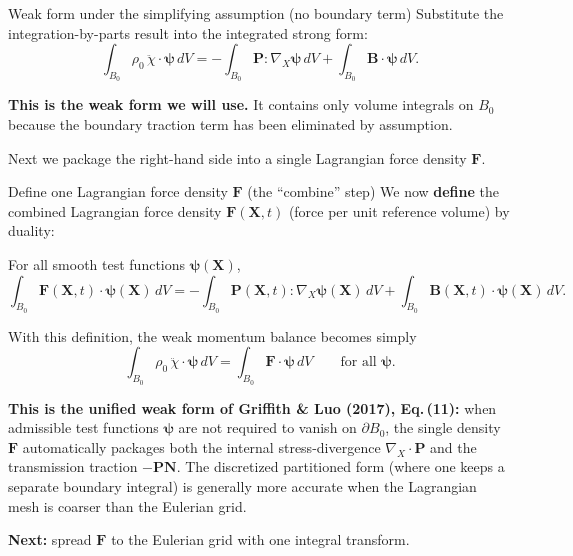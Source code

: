 \documentclass[aspectratio=169]{beamer}
\newcommand{\X}{\bm{X}}
\newcommand{\gradX}{\nabla_{\!X}}
\newcommand{\divX}{\nabla_{\!X}\!\cdot}
\newcommand{\Pten}{\bm{P}}        %
\newcommand{\Nvec}{\bm{N}}       %
\newcommand{\FLag}{\bm{F}}       %
\begin{document}
\begin{frame}{Weak form under the simplifying assumption (no boundary term)}
\small
Substitute the integration-by-parts result into the integrated strong form:
\[
\int_{B_0}\rho_0\,\ddot{\chi}\cdot\bm{\psi}\,dV
=
-\int_{B_0}\Pten:\gradX\bm{\psi}\,dV
+
\int_{B_0}\bm{B}\cdot\bm{\psi}\,dV.
\]

\medskip
\textbf{This is the weak form we will use.}
It contains only volume integrals on \(B_0\) because the boundary traction term has been eliminated by assumption.

\medskip
Next we package the right-hand side into a single Lagrangian force density \(\FLag\).
\end{frame}


\begin{frame}{Define one Lagrangian force density \(\FLag\) (the ``combine'' step)}
\small
We now \textbf{define} the combined Lagrangian force density \(\FLag(\X,t)\)
(force per unit reference volume) by duality:

\medskip
For all smooth test functions \(\bm{\psi}(\X)\),
\[
\int_{B_0}\FLag(\X,t)\cdot\bm{\psi}(\X)\,dV
=
-\int_{B_0}\Pten(\X,t):\gradX\bm{\psi}(\X)\,dV
+
\int_{B_0}\bm{B}(\X,t)\cdot\bm{\psi}(\X)\,dV.
\]

\medskip
With this definition, the weak momentum balance becomes simply
\[
\int_{B_0}\rho_0\,\ddot{\chi}\cdot\bm{\psi}\,dV
=
\int_{B_0}\FLag\cdot\bm{\psi}\,dV
\qquad \text{for all } \bm{\psi}.
\]

\medskip
\scriptsize \textbf{This is the unified weak form of Griffith \& Luo (2017), Eq.\,(11):} when admissible test functions \(\bm{\psi}\) are not required to vanish on \(\partial B_0\), the single density \(\FLag\) automatically packages both the internal stress-divergence \(\divX\Pten\) and the transmission traction \(-\Pten\Nvec\). The discretized partitioned form (where one keeps a separate boundary integral) is generally more accurate when the Lagrangian mesh is coarser than the Eulerian grid.

\medskip
\small
\textbf{Next:} spread \(\FLag\) to the Eulerian grid with one integral transform.
\end{frame}
\end{document}
